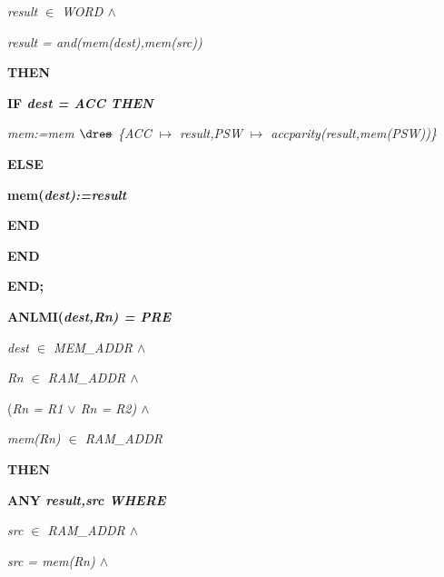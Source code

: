 \begin{sloppypar}
\hspace*{0.30in}\it result $\in$  \it WORD  $\land$ 

\hspace*{0.30in}\it result \rm = \it and\rm (\it mem\rm (\it dest\rm )\rm ,\it mem\rm (\it src\rm )\rm )

\hspace*{0.20in}\bf THEN

\hspace*{0.30in}\bf IF \it dest \rm = \it ACC \bf THEN

\hspace*{0.40in}\it mem\rm :=\it mem $\lover$ \rm \{\it ACC $\mapsto$ \it result\rm ,\it PSW $\mapsto$ \it accparity\rm (\it result\rm ,\it mem\rm (\it PSW\rm )\rm )\rm \}

\hspace*{0.30in}\bf ELSE

\hspace*{0.40in}\bf mem\rm (\it dest\rm )\rm :=\it result

\hspace*{0.30in}\bf END

\hspace*{0.20in}\bf END

\hspace*{0.10in}\bf END\rm ;

\hspace*{0.10in}\bf ANLMI\rm (\it dest\rm ,\it Rn\rm ) \rm = \bf PRE

\hspace*{0.20in}\it dest $\in$  \it MEM\_ADDR  $\land$ 

\hspace*{0.20in}\it Rn $\in$  \it RAM\_ADDR  $\land$ 

\hspace*{0.20in}\rm (\it Rn \rm = \it R1  $\lor$  \it Rn \rm = \it R2\rm )  $\land$ 

\hspace*{0.20in}\it mem\rm (\it Rn\rm ) $\in$  \it RAM\_ADDR

\hspace*{0.10in}\bf THEN

\hspace*{0.20in}\bf ANY \it result\rm ,\it src \bf WHERE

\hspace*{0.30in}\it src $\in$  \it RAM\_ADDR  $\land$ 

\hspace*{0.30in}\it src \rm = \it mem\rm (\it Rn\rm )  $\land$ 


\end{sloppypar}

